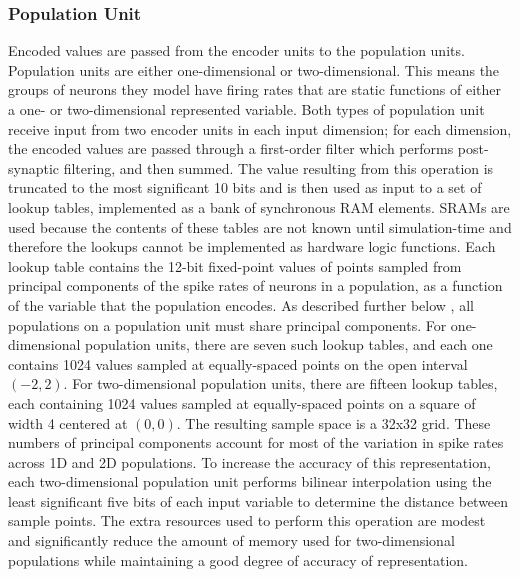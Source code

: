 \documentclass[english]{article}
\begin{document}
\subsubsection{Population Unit}

Encoded values are passed from the encoder units to the population units. 
Population units are either one-dimensional or two-dimensional.
This means the groups of neurons they model have firing rates that are static functions of either a one- or two-dimensional represented variable.
Both types of population unit receive input from two encoder units in each input dimension;
for each dimension, the encoded values are passed through a first-order filter which performs post-synaptic filtering, %
and then summed. The value resulting from this operation is
truncated to the most significant 10 bits and is then used as input to a set of lookup tables,
implemented as a bank of synchronous RAM elements. SRAMs are used
because the contents of these tables are not known until simulation-time and therefore the lookups cannot be implemented as hardware logic functions.
Each lookup table contains the 12-bit fixed-point values of points sampled from 
principal components of the spike rates of neurons in a population, as a function of the variable that the population encodes.
As described further below
, all populations on a population unit must share principal components.
For one-dimensional population units, there are seven such lookup tables, and each one contains
1024 values sampled at equally-spaced points on the open interval $(-2, 2)$. For two-dimensional population units,
there are fifteen lookup tables, each containing 1024 values sampled at equally-spaced points on a square of width 4
centered at $(0, 0)$. The resulting sample space is a 32x32 grid.
These numbers of principal components account for most of the variation in spike rates across 1D and 2D populations.
To increase the accuracy of this representation, each two-dimensional population unit performs bilinear interpolation
using the least significant five bits of each input variable to determine the distance between sample points. 
The extra resources used to perform this operation are modest
and significantly reduce the amount of memory used for two-dimensional populations while maintaining a good degree of accuracy of representation.
\end{document}
